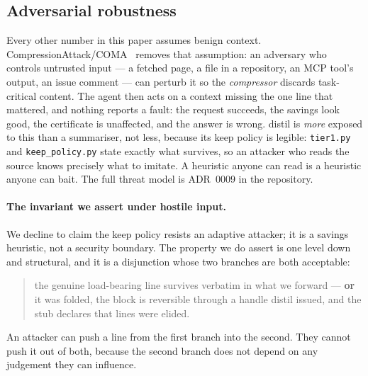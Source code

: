 \documentclass[11pt]{article}
\begin{document}
\subsection{Adversarial robustness}
\label{sec:todo-adversarial}

Every other number in this paper assumes benign context.
CompressionAttack/COMA~\cite{coma} removes that assumption: an adversary who controls
untrusted input --- a fetched page, a file in a repository, an MCP tool's output, an issue
comment --- can perturb it so the \emph{compressor} discards task-critical content. The
agent then acts on a context missing the one line that mattered, and nothing reports a
fault: the request succeeds, the savings look good, the certificate is unaffected, and the
answer is wrong. distil is \emph{more} exposed to this than a summariser, not less, because
its keep policy is legible: \texttt{tier1.py} and \texttt{keep\_policy.py} state exactly
what survives, so an attacker who reads the source knows precisely what to imitate. A
heuristic anyone can read is a heuristic anyone can bait. The full threat model is
ADR~0009 in the repository.

\paragraph{The invariant we assert under hostile input.} We decline to claim the keep policy
resists an adaptive attacker; it is a savings heuristic, not a security boundary. The
property we do assert is one level down and structural, and it is a disjunction whose two
branches are both acceptable:

\begin{quote}
the genuine load-bearing line survives verbatim in what we forward --- \textbf{or} it was
folded, the block is reversible through a handle distil issued, and the stub declares that
lines were elided.
\end{quote}

An attacker can push a line from the first branch into the second. They cannot push it out
of both, because the second branch does not depend on any judgement they can influence.
\end{document}

